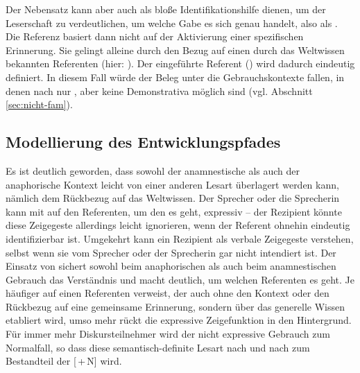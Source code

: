 \noindent 
Der Nebensatz kann aber auch als bloße Identifikationshilfe dienen, um der Leserschaft zu verdeutlichen, um welche Gabe es sich genau handelt, also als  \parencite[79]{Himmelmann1997}. Die Referenz  basiert dann nicht auf der Aktivierung einer spezifischen Erinnerung. Sie gelingt alleine durch den Bezug auf einen durch das Weltwissen bekannten Referenten (hier: ). Der eingeführte Referent () wird dadurch eindeutig definiert.  In diesem Fall würde der Beleg unter die  Gebrauchskontexte fallen, in denen nach \textcite{Hawkins1978} nur , aber keine Demonstrativa  möglich sind (vgl. Abschnitt \ref{sec:nicht-fam}). 

%
%

\subsection{Modellierung des Entwicklungspfades}\label{sec:disk-entwicklung}

Es ist deutlich geworden, dass sowohl der anamnestische  als auch der anaphorische  Kontext leicht von einer anderen Lesart überlagert werden kann, nämlich dem Rückbezug auf das Weltwissen. Der Sprecher oder die Sprecherin kann mit   auf den Referenten, um den es geht, expressiv  -- der Rezipient könnte diese Zeigegeste allerdings leicht ignorieren, wenn der Referent ohnehin eindeutig identifizierbar ist. Umgekehrt kann ein Rezipient  als verbale Zeigegeste verstehen, selbst wenn sie vom Sprecher oder der Sprecherin gar nicht intendiert ist.
Der Einsatz von  sichert sowohl beim anaphorischen  als auch beim anamnestischen  Gebrauch das Verständnis und macht deutlich, um welchen Referenten es geht. Je häufiger  auf einen Referenten verweist, der auch ohne den Kontext oder den Rückbezug auf eine gemeinsame Erinnerung, sondern über das generelle Wissen etabliert wird, umso mehr rückt die expressive Zeigefunktion in den Hintergrund. Für immer mehr Diskursteilnehmer wird der nicht expressive Gebrauch zum Normalfall, so dass diese semantisch-definite  Lesart nach und nach zum Bestandteil der [\,+\,N] wird. 

